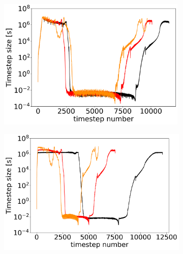\begin{figure}[H]
\begin{subfigure}[b]{0.32\textwidth}
	\end{subfigure}
	\begin{subfigure}[b]{0.32\textwidth}
		\centering
		\includegraphics[width=0.99\textwidth]{images/TANDEM_DT_differentSizes_extendedDAE.png}
	\end{subfigure}
	\begin{subfigure}[b]{0.32\textwidth}
		\centering
		\includegraphics[width=1\textwidth]{images/TANDEM_DT_differentSizes_compactODE.png}
	\end{subfigure}
	\begin{subfigure}[b]{0.32\textwidth}
		\centering

\end{subfigure}
\end{figure}
